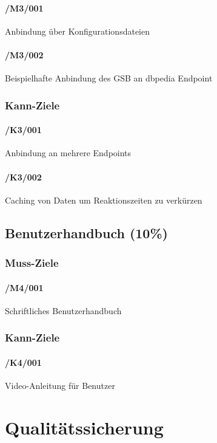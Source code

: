 \paragraph{/M3/001} Anbindung über Konfigurationsdateien
\paragraph{/M3/002} Beispielhafte Anbindung des GSB an dbpedia Endpoint 

\subsubsection*{Kann-Ziele}

\paragraph{/K3/001} Anbindung an mehrere Endpoints
\paragraph{/K3/002} Caching von Daten um Reaktionszeiten zu verkürzen

\subsection{Benutzerhandbuch (10\%)}

\subsubsection*{Muss-Ziele}

\paragraph{/M4/001} Schriftliches Benutzerhandbuch

\subsubsection*{Kann-Ziele}

\paragraph{/K4/001} Video-Anleitung für Benutzer


\section{Qualitätssicherung}

